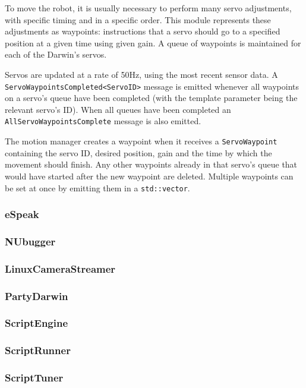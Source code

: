 \documentclass[english,12pt]{scrartcl}
\begin{document}
				To move the robot, it is usually necessary to perform many servo adjustments,
				with specific timing and in a specific order. This module represents these
				adjustments as waypoints: instructions that a servo should go to a specified
				position at a given time using given gain. A queue of waypoints is maintained
				for each of the Darwin's servos.
				
				Servos are updated at a rate of 50Hz, using the most recent sensor data. 
				A \texttt{ServoWaypointsCompleted<ServoID>} message is emitted whenever all waypoints on a servo's queue have been completed (with the template parameter being the relevant servo's ID). 
				When all queues have been completed an \texttt{AllServoWaypointsComplete} message is also emitted.
				
				The motion manager creates a waypoint when it receives a \texttt{ServoWaypoint}
				containing the servo ID, desired position, gain and the time by which the movement should finish. Any other waypoints already in that servo's queue that
				would have started after the new waypoint are deleted. Multiple waypoints can be
				set at once by emitting them in a \texttt{std::vector}.

			\subsubsection{eSpeak}
			\subsubsection{NUbugger}
			\subsubsection{LinuxCameraStreamer}
			\subsubsection{PartyDarwin}
			\subsubsection{ScriptEngine}
			\subsubsection{ScriptRunner}
			\subsubsection{ScriptTuner}


	
	
	
	\printglossaries
\end{document}
